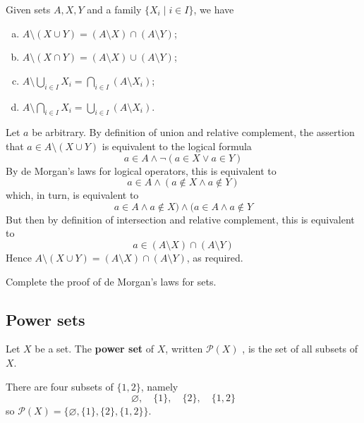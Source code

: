 \begin{theorem}
\label{thmDeMorganForSets}
Given sets $A,X,Y$ and a family $\{ X_i \mid i \in I \}$, we have
\begin{enumerate}[(a)] 
\item $A \setminus (X \cup Y) = (A \setminus X) \cap (A \setminus Y)$;
\item $A \setminus (X \cap Y) = (A \setminus X) \cup (A \setminus Y)$;
\item $\displaystyle A \setminus \bigcup_{i \in I} X_i = \bigcap_{i \in I} (A \setminus X_i)$;
\item $\displaystyle A \setminus \bigcap_{i \in I} X_i = \bigcup_{i \in I} (A \setminus X_i)$.
\end{enumerate}
\end{theorem}

\begin{cproof}[of (a)]
Let $a$ be arbitrary. By definition of union and relative complement, the assertion that $a \in A \setminus (X \cup Y)$ is equivalent to the logical formula
\[ a \in A \wedge \neg (a \in X \vee a \in Y) \]
By de Morgan's laws for logical operators, this is equivalent to
\[ a \in A \wedge (a \not\in X \wedge a \not\in Y) \]
which, in turn, is equivalent to
\[ a \in A \wedge a \not\in X) \wedge (a \in A \wedge a \not\in Y \]
But then by definition of intersection and relative complement, this is equivalent to
\[ a \in (A \setminus X) \cap (A \setminus Y) \]
Hence $A \setminus (X \cup Y) = (A \setminus X) \cap (A \setminus Y)$, as required.
\end{cproof}

\begin{exercise}
Complete the proof of de Morgan's laws for sets.
\end{exercise}

\subsection*{Power sets}

\begin{definition}
\label{defPowerSet}
Let $X$ be a set. The \textbf{power set} of $X$, written $\mathcal{P}(X)$ , is the set of all subsets of $X$.
\end{definition}

\begin{example}
There are four subsets of $\{ 1, 2 \}$, namely
\[ \varnothing, \quad \{ 1 \}, \quad \{ 2 \}, \quad \{ 1, 2 \} \]
so $\mathcal{P}(X) = \{\varnothing, \{ 1 \}, \{ 2 \}, \{ 1, 2 \}\}$.
\end{example}

